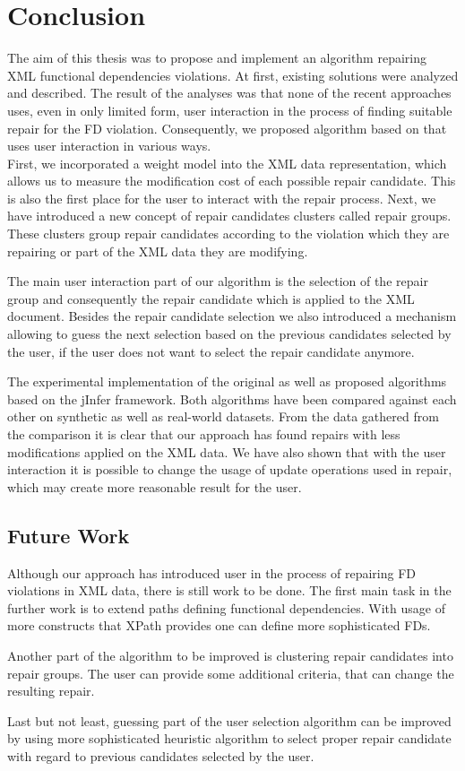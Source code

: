 \chapter{Conclusion}

The aim of this thesis was to propose and implement an algorithm repairing XML functional dependencies violations. At first, existing solutions were analyzed and described. The result of the analyses was that none of the recent approaches uses, even in only limited form, user interaction in the process of finding suitable repair for the FD violation. Consequently, we proposed algorithm based on \cite{RepAndConsistentAnswer} that uses user interaction in various ways.\\

First, we incorporated a weight model into the XML data representation, which allows us to measure the modification cost of each possible repair candidate. This is also the first place for the user to interact with the repair process. Next, we have introduced a new concept of repair candidates clusters called repair groups. These clusters group repair candidates according to the violation which they are repairing or part of the XML data they are modifying.

The main user interaction part of our algorithm is the selection of the repair group and consequently the repair candidate which is applied to the XML document. Besides the repair candidate selection we also introduced a mechanism allowing to guess the next selection based on the previous candidates selected by the user, if the user does not want to select the repair candidate anymore.

The experimental implementation of the original as well as proposed algorithms based on the jInfer framework. Both algorithms have been compared against each other on synthetic as well as real-world datasets. From the data gathered from the comparison it is clear that our approach has found repairs with less modifications applied on the XML data. We have also shown that with the user interaction it is possible to change the usage of update operations used in repair, which may create more reasonable result for the user.

\section{Future Work}

Although our approach has introduced user in the process of repairing FD violations in XML data, there is still work to be done. The first main task in the further work is to extend paths defining functional dependencies. With usage of more constructs that XPath provides one can define more sophisticated FDs.

Another part of the algorithm to be improved is clustering repair candidates into repair groups. The user can provide some additional criteria, that can change the resulting repair.

Last but not least, guessing part of the user selection algorithm can be improved by using more sophisticated heuristic algorithm to select proper repair candidate with regard to previous candidates selected by the user.
